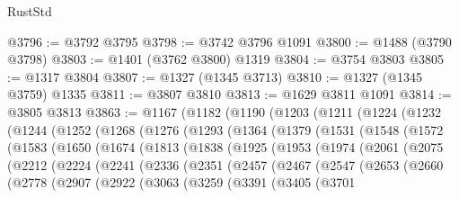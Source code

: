 \begin{lexlean}{RustStd}
\begin{coremodule}
{\begin{coremodule}
{{{{{{{{{{{{{{{{{{{{{{{{{{{{{{{{{{{{{{@3796 := @3792 @3795
@3798 := @3742 @3796 @1091
@3800 := @1488 (@3790 @3798)
@3803 := @1401 (@3762 @3800) @1319
@3804 := @3754 @3803
@3805 := @1317 @3804
@3807 := @1327 (@1345 @3713)
@3810 := @1327 (@1345 @3759) @1335
@3811 := @3807 @3810
@3813 := @1629 @3811 @1091
@3814 := @3805 @3813
@3863 := @1167
    (@1182
      (@1190
        (@1203
          (@1211
            (@1224
              (@1232
                (@1244
                  (@1252
                    (@1268
                      (@1276
                        (@1293
                          (@1364
                            (@1379
                              (@1531
                                (@1548
                                  (@1572
                                    (@1583
                                      (@1650
                                        (@1674
                                          (@1813
                                            (@1838
                                              (@1925
                                                (@1953
                                                  (@1974
                                                    (@2061
                                                      (@2075
                                                        (@2212
                                                          (@2224
                                                            (@2241
                                                              (@2336
                                                                (@2351
                                                                  (@2457
                                                                    (@2467
                                                                      (@2547
                                                                        (@2653
                                                                          (@2660
                                                                            (@2778
                                                                              (@2907
                                                                                (@2922
                                                                                  (@3063
                                                                                    (@3259
                                                                                      (@3391
                                                                                        (@3405
                                                                                          (@3701
}}}}}}}}}}}}}}}}}}}}}}}}}}}}}}}}}}}}}}
\end{coremodule}}
\end{coremodule}
\end{lexlean}
